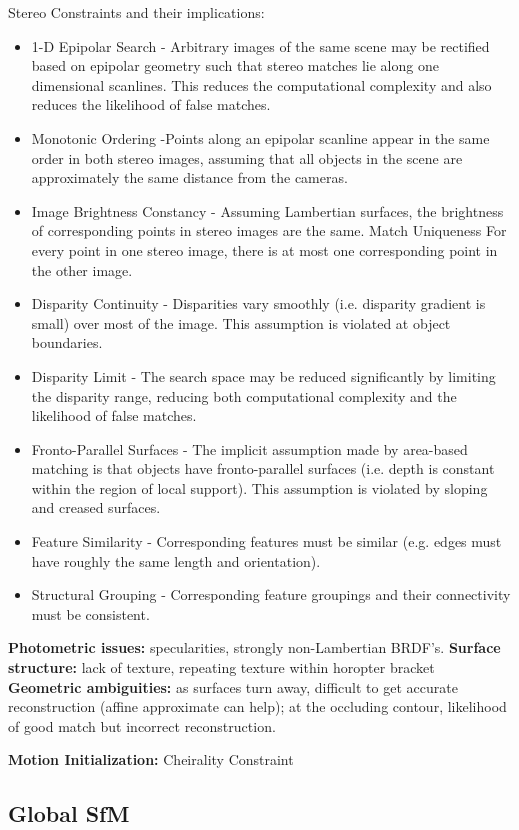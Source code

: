 Stereo Constraints and their implications:
\begin{itemize}
\item 1-D Epipolar Search -  Arbitrary images of the same scene may be rectified based on epipolar geometry such that stereo matches lie along one dimensional scanlines. This reduces the computational complexity
and also reduces the likelihood of false matches.
\item Monotonic Ordering  -Points along an epipolar scanline appear in the same order in both stereo images, assuming that all objects in the scene are approximately the same distance from the cameras.
\item Image Brightness Constancy - Assuming Lambertian surfaces, the brightness of corresponding
points in stereo images are the same.
Match Uniqueness For every point in one stereo image, there is at most one corresponding point in the other image.
\item Disparity Continuity - Disparities vary smoothly (i.e. disparity gradient is small) over most of the image. This assumption is violated at object boundaries.
\item Disparity Limit - The search space may be reduced significantly by limiting the disparity range, reducing both computational complexity and the likelihood of false matches.
\item Fronto-Parallel Surfaces - The implicit assumption made by area-based matching is that objects have fronto-parallel surfaces (i.e. depth is constant within the region of local support). This assumption is violated by sloping and creased surfaces.
\item Feature Similarity - Corresponding features must be similar (e.g. edges must have roughly the same length and orientation).
\item Structural Grouping - Corresponding feature groupings and their connectivity must be consistent.
\end{itemize}

\textbf{Photometric issues:} specularities, strongly non-Lambertian BRDF’s.
\textbf{Surface structure:} lack of texture, repeating texture within horopter bracket
\textbf{Geometric ambiguities:} as surfaces turn away, difficult to get accurate reconstruction
(affine approximate can help); at the occluding contour, likelihood of good match but incorrect
reconstruction. 

\textbf{Motion Initialization:} Cheirality Constraint

\subsection{Global SfM}

